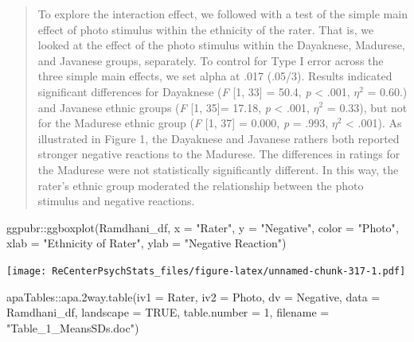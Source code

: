 \documentclass[
  11pt,
]{book}
\newenvironment{Shaded}{\begin{snugshade}}{\end{snugshade}}
\newcommand{\AttributeTok}[1]{\textcolor[rgb]{0.77,0.63,0.00}{#1}}
\newcommand{\ConstantTok}[1]{\textcolor[rgb]{0.00,0.00,0.00}{#1}}
\newcommand{\DecValTok}[1]{\textcolor[rgb]{0.00,0.00,0.81}{#1}}
\newcommand{\FunctionTok}[1]{\textcolor[rgb]{0.00,0.00,0.00}{#1}}
\newcommand{\NormalTok}[1]{#1}
\newcommand{\SpecialCharTok}[1]{\textcolor[rgb]{0.00,0.00,0.00}{#1}}
\newcommand{\StringTok}[1]{\textcolor[rgb]{0.31,0.60,0.02}{#1}}
\begin{document}
\begin{quote}
To explore the interaction effect, we followed with a test of the simple main effect of photo stimulus within the ethnicity of the rater. That is, we looked at the effect of the photo stimulus within the Dayaknese, Madurese, and Javanese groups, separately. To control for Type I error across the three simple main effects, we set alpha at .017 (.05/3). Results indicated significant differences for Dayaknese (\emph{F} {[}1, 33{]} = 50.4, \emph{p} \textless{} .001, \(\eta ^{2}\) = 0.60.) and Javanese ethnic groups (\emph{F} {[}1, 35{]}= 17.18, \emph{p} \textless{} .001, \(\eta ^{2}\) = 0.33), but not for the Madurese ethnic group (\emph{F} {[}1, 37{]} = 0.000, \emph{p} = .993, \(\eta ^{2}\) \textless{} .001). As illustrated in Figure 1, the Dayaknese and Javanese rathers both reported stronger negative reactions to the Madurese. The differences in ratings for the Madurese were not statistically significantly different. In this way, the rater's ethnic group moderated the relationship between the photo stimulus and negative reactions.
\end{quote}

\begin{Shaded}
\begin{Highlighting}[]
\NormalTok{ggpubr}\SpecialCharTok{::}\FunctionTok{ggboxplot}\NormalTok{(Ramdhani\_df, }\AttributeTok{x =} \StringTok{"Rater"}\NormalTok{, }\AttributeTok{y =} \StringTok{"Negative"}\NormalTok{, }\AttributeTok{color =} \StringTok{"Photo"}\NormalTok{,}
    \AttributeTok{xlab =} \StringTok{"Ethnicity of Rater"}\NormalTok{, }\AttributeTok{ylab =} \StringTok{"Negative Reaction"}\NormalTok{)}
\end{Highlighting}
\end{Shaded}

\texttt{[image: ReCenterPsychStats\_files/figure-latex/unnamed-chunk-317-1.pdf]}

\begin{Shaded}
\begin{Highlighting}[]
\NormalTok{apaTables}\SpecialCharTok{::}\FunctionTok{apa.2way.table}\NormalTok{(}\AttributeTok{iv1 =}\NormalTok{ Rater, }\AttributeTok{iv2 =}\NormalTok{ Photo, }\AttributeTok{dv =}\NormalTok{ Negative, }\AttributeTok{data =}\NormalTok{ Ramdhani\_df,}
    \AttributeTok{landscape =} \ConstantTok{TRUE}\NormalTok{, }\AttributeTok{table.number =} \DecValTok{1}\NormalTok{, }\AttributeTok{filename =} \StringTok{"Table\_1\_MeansSDs.doc"}\NormalTok{)}
\end{Highlighting}
\end{Shaded}
\end{document}
